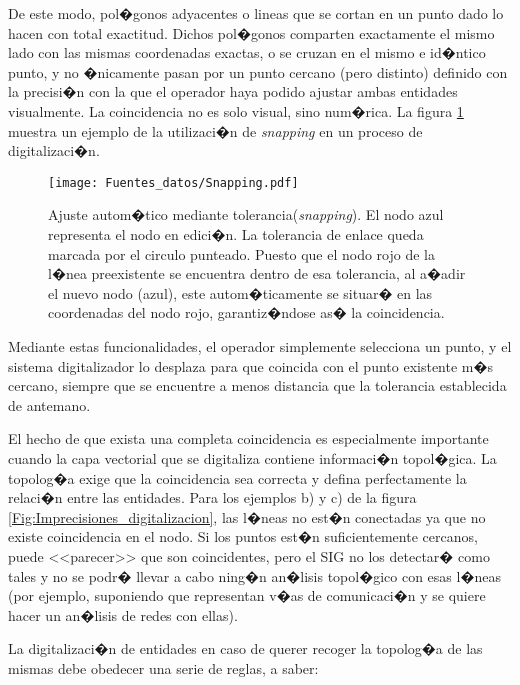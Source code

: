 De este modo, pol�gonos adyacentes o lineas que se cortan en un punto dado lo hacen con total exactitud. Dichos pol�gonos comparten exactamente el mismo lado con las mismas coordenadas exactas, o se cruzan en el mismo e id�ntico punto, y no �nicamente pasan por un punto cercano (pero distinto) definido con la precisi�n con la que el operador haya podido ajustar ambas entidades visualmente. La coincidencia no es solo visual, sino num�rica. La figura \ref{Fig:Snapping} muestra un ejemplo de la utilizaci�n de \emph{snapping} en un proceso de digitalizaci�n.

\begin{figure}
\centering
\texttt{[image: Fuentes\_datos/Snapping.pdf]}
\caption{\small Ajuste autom�tico mediante tolerancia(\emph{snapping}). El nodo azul representa el nodo en edici�n. La tolerancia de enlace queda marcada por el circulo punteado. Puesto que el nodo rojo de la l�nea preexistente se encuentra dentro de esa tolerancia, al a�adir el nuevo nodo (azul), este autom�ticamente se situar� en las coordenadas del nodo rojo, garantiz�ndose as� la coincidencia.}
\label{Fig:Snapping} 
\end{figure}

Mediante estas funcionalidades, el operador simplemente selecciona un punto, y el sistema digitalizador lo desplaza para que coincida con el punto existente m�s cercano, siempre que se encuentre a menos distancia que la tolerancia establecida de antemano.

El hecho de que exista una completa coincidencia es especialmente importante cuando la capa vectorial que se digitaliza contiene informaci�n topol�gica. La topolog�a exige que la coincidencia sea correcta y defina perfectamente la relaci�n entre las entidades. Para los ejemplos b) y c) de la figura \ref{Fig:Imprecisiones_digitalizacion}, las l�neas no est�n conectadas ya que no existe coincidencia en el nodo. Si los puntos est�n suficientemente cercanos, puede <<parecer>> que son coincidentes, pero el SIG no los detectar� como tales y no se podr� llevar a cabo ning�n an�lisis topol�gico con esas l�neas (por ejemplo, suponiendo que representan v�as de comunicaci�n y se quiere hacer un an�lisis de redes con ellas).

La digitalizaci�n de entidades en caso de querer recoger la topolog�a de las mismas debe obedecer una serie de reglas, a saber\cite{GrassDigitizing}:

